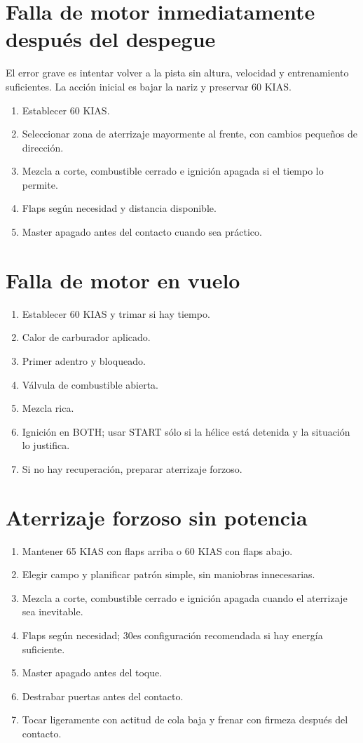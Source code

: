\documentclass[11pt,oneside]{book}
\newenvironment{checklist}{\begin{enumerate}[label=\arabic*.]}{\end{enumerate}}
\begin{document}
\section{Falla de motor inmediatamente después del despegue}

El error grave es intentar volver a la pista sin altura, velocidad y entrenamiento suficientes. La acción inicial es bajar la nariz y preservar 60 KIAS.

\begin{checklist}
\item Establecer 60 KIAS.
\item Seleccionar zona de aterrizaje mayormente al frente, con cambios pequeños de dirección.
\item Mezcla a corte, combustible cerrado e ignición apagada si el tiempo lo permite.
\item Flaps según necesidad y distancia disponible.
\item Master apagado antes del contacto cuando sea práctico.
\end{checklist}

\section{Falla de motor en vuelo}

\begin{checklist}
\item Establecer 60 KIAS y trimar si hay tiempo.
\item Calor de carburador aplicado.
\item Primer adentro y bloqueado.
\item Válvula de combustible abierta.
\item Mezcla rica.
\item Ignición en BOTH; usar START sólo si la hélice está detenida y la situación lo justifica.
\item Si no hay recuperación, preparar aterrizaje forzoso.
\end{checklist}

\section{Aterrizaje forzoso sin potencia}

\begin{checklist}
\item Mantener 65 KIAS con flaps arriba o 60 KIAS con flaps abajo.
\item Elegir campo y planificar patrón simple, sin maniobras innecesarias.
\item Mezcla a corte, combustible cerrado e ignición apagada cuando el aterrizaje sea inevitable.
\item Flaps según necesidad; 30\textdegree es configuración recomendada si hay energía suficiente.
\item Master apagado antes del toque.
\item Destrabar puertas antes del contacto.
\item Tocar ligeramente con actitud de cola baja y frenar con firmeza después del contacto.
\end{checklist}
\end{document}
